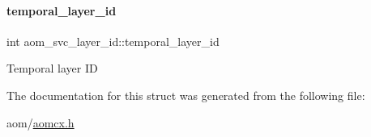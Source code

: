\paragraph{\texorpdfstring{temporal\+\_\+layer\+\_\+id}{temporal\_layer\_id}}
{\footnotesize\ttfamily int aom\+\_\+svc\+\_\+layer\+\_\+id\+::temporal\+\_\+layer\+\_\+id}

Temporal layer ID 

The documentation for this struct was generated from the following file\+:\begin{DoxyCompactItemize}
\item 
aom/\hyperlink{aomcx_8h}{aomcx.\+h}\end{DoxyCompactItemize}
